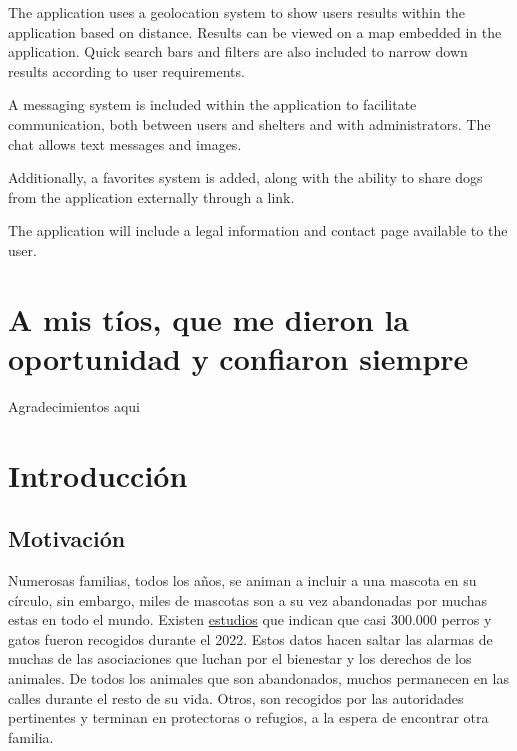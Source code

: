 \documentclass[a4paper, 12pt]{article}
\begin{document}
The application uses a geolocation system to show users results within the application based on distance. Results can be viewed on a map embedded in the application. Quick search bars and filters are also included to narrow down results according to user requirements.

A messaging system is included within the application to facilitate communication, both between users and shelters and with administrators. The chat allows text messages and images.

Additionally, a favorites system is added, along with the ability to share dogs from the application externally through a link.

The application will include a legal information and contact page available to the user.

\newpage
\thispagestyle{empty}
\mbox{}

\newpage
\section*{A mis tíos, que me dieron la oportunidad y confiaron siempre}
\begin{center} 
\vspace*{\fill}
Agradecimientos aqui
\vspace*{\fill}
\end{center} 

\newpage
\thispagestyle{empty}
\mbox{}
\newpage
\thispagestyle{empty}
\mbox{}

\tableofcontents
\listoftables
\listoffigures

\newpage
\thispagestyle{empty}
\mbox{}

\newpage
\section{Introducción}

\subsection{Motivación}
Numerosas familias, todos los años, se animan a incluir a una mascota en su círculo, sin embargo, miles de mascotas son a su vez abandonadas por muchas estas en todo el mundo. Existen \href{https://www.fundacion-affinity.org/perros-gatos-y-personas/busco-un-animal-de-compania/las-cifras-del-abandono-de-perros-y-gatos-aun}{estudios} que indican que casi 300.000 perros y gatos fueron recogidos durante el 2022. Estos datos hacen saltar las alarmas de muchas de las asociaciones que luchan por el bienestar y los derechos de los animales. De todos los animales que son abandonados, muchos permanecen en las calles durante el resto de su vida. Otros, son recogidos por las autoridades pertinentes y terminan en protectoras o refugios, a la espera de encontrar otra familia. 
\end{document}
